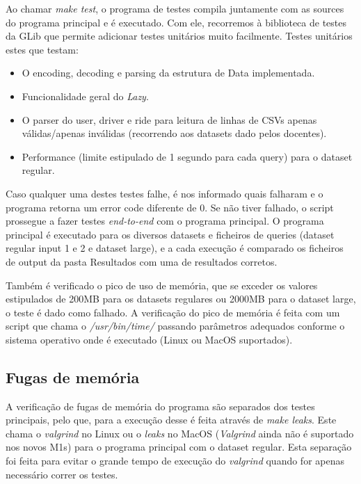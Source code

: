 \documentclass{article}
\begin{document}
        \medskip
        Ao chamar \textit{make test}, o programa de testes compila juntamente com as sources do programa principal e é executado.
        Com ele, recorremos à biblioteca de testes da GLib que permite adicionar testes unitários
        muito facilmente. Testes unitários estes que testam:
        \begin{itemize}
            \item O encoding, decoding e parsing da estrutura de Data implementada.
            \item Funcionalidade geral do \textit{Lazy}.
            \item O parser do user, driver e ride para leitura de linhas de CSVs apenas válidas/apenas inválidas (recorrendo aos datasets dado pelos docentes).
            \item Performance (limite estipulado de 1 segundo para cada query) para o dataset regular.
        \end{itemize}
        Caso qualquer uma destes testes falhe, é nos informado quais falharam e o programa retorna um error code diferente de 0.
        Se não tiver falhado, o script prossegue a fazer testes \textit{end-to-end} com o programa principal.
        O programa principal é executado para os diversos datasets e ficheiros de queries (dataset regular input 1 e 2 e dataset large),
        e a cada execução é comparado os ficheiros de output da pasta Resultados com uma de resultados corretos.
        
        Também é verificado o pico de uso de memória, que se exceder os valores estipulados de 
        200MB para os datasets regulares ou 2000MB para o dataset large, o teste é dado como falhado.
        A verificação do pico de memória é feita com um script que chama o \textit{/usr/bin/time/}
        passando parâmetros adequados conforme o sistema operativo onde é executado (Linux ou MacOS suportados).
        
        \subsection{Fugas de memória}
        A verificação de fugas de memória do programa são separados dos testes principais, pelo que,
        para a execução desse é feita através de \textit{make leaks}. Este chama o \textit{valgrind}
        no Linux ou o \textit{leaks} no MacOS (\textit{Valgrind} ainda não é suportado nos novos M1s) para 
        o programa principal com o dataset regular. Esta separação foi feita para evitar o grande
        tempo de execução do \textit{valgrind} quando for apenas necessário correr os testes.
        
\end{document}
